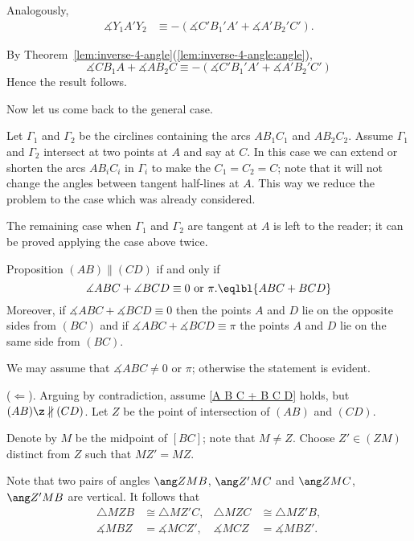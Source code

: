 Analogously,
\begin{align*}
\measuredangle Y_1A'Y_2&
\equiv -(\measuredangle C'B_1'A'+\measuredangle A'B_2' C').
\end{align*}

By Theorem~\ref{lem:inverse-4-angle}(\ref{lem:inverse-4-angle:angle}), 
\[\measuredangle CB_1A+\measuredangle AB_2 C
\equiv
-(\measuredangle C'B_1'A'+\measuredangle A'B_2' C')
\]
Hence the result follows.

Now let us come back to the general case.

Let $\Gamma_1$ and $\Gamma_2$ be the circlines containing the arcs $AB_1C_1$ and $AB_2C_2$.
Assume $\Gamma_1$ and $\Gamma_2$ intersect at two points at $A$ and say at $C$.
In this case we can extend or shorten the arcs  $AB_iC_i$ in $\Gamma_i$ to make the $C_1=C_2=C$;
note that it will not change the angles between tangent half-lines at $A$.
This way we reduce the problem to the case which was already considered.

The remaining case when $\Gamma_1$ and $\Gamma_2$ are tangent at $A$ is left to the reader;
it can be proved applying the case above twice.
\qeds













\begin{thm}{Proposition}\label{prop:parallel-2}
$(AB)\parallel(C D)$ if and only if 
$$\measuredangle A B C+\measuredangle B C D\equiv 0\ \text{or}\ \pi.\eqlbl{A B C + B C D}$$ 
Moreover, if $\measuredangle A B C+\measuredangle B C D\equiv 0$
then the points $A$ and $D$ lie on the opposite sides from $(BC)$ 
and if $\measuredangle A B C+\measuredangle B C D\equiv \pi$
 the points $A$ and $D$ lie on the same side from $(BC)$.
\end{thm}

We may assume that $\measuredangle ABC\ne 0$ or $\pi$;
otherwise the statement is evident. 

\parit{}($\Leftarrow$).
Arguing by contradiction, 
assume \ref{A B C + B C D} holds, but $(AB)\z\nparallel(C D)$.
Let $Z$ be the point of intersection of $(AB)$ and $(CD)$.

Denote by $M$ be the midpoint of $[BC]$; note that $M\ne Z$.
Choose $Z'\in (ZM)$ distinct from $Z$ such that $MZ'=MZ$.

Note that two pairs of angles 
$\ang ZMB$, $\ang Z'MC$
and
$\ang ZMC$, $\ang Z'MB$
are vertical.
It follows that
\begin{align*}
\triangle MZB&\cong \triangle MZ'C,
& 
\triangle MZC&\cong \triangle MZ'B,
\\
\measuredangle MBZ&=\measuredangle MCZ',
&
\measuredangle MCZ&=\measuredangle MBZ'.
\end{align*}

